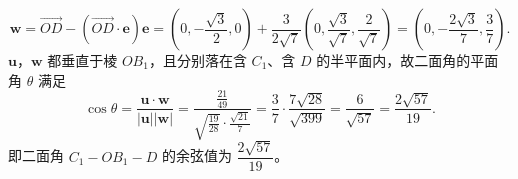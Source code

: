\begin{answer}
\nopagebreak[4]
\[\boldsymbol w=\overrightarrow{OD}-\left(\overrightarrow{OD}\cdot\boldsymbol e\right)\boldsymbol e
=\left(0,-\frac{\sqrt3}2,0\right)+\frac3{2\sqrt7}\left(0,\frac{\sqrt3}{\sqrt7},\frac2{\sqrt7}\right)
=\left(0,-\frac{2\sqrt3}7,\frac37\right).\]
$\boldsymbol u$，$\boldsymbol w$ 都垂直于棱 $OB_1$，且分别落在含 $C_1$、含 $D$ 的半平面内，故二面角的平面角 $\theta$ 满足
\nopagebreak[4]
\[\cos\theta=\frac{\boldsymbol u\cdot\boldsymbol w}{|\boldsymbol u||\boldsymbol w|}
=\frac{\frac{21}{49}}{\sqrt{\frac{19}{28}}\cdot\frac{\sqrt{21}}7}
=\frac{3}{7}\cdot\frac{7\sqrt{28}}{\sqrt{399}}
=\frac{6}{\sqrt{57}}=\frac{2\sqrt{57}}{19}.\]
即二面角 $C_1-OB_1-D$ 的余弦值为 $\dfrac{2\sqrt{57}}{19}$。



\end{answer}
